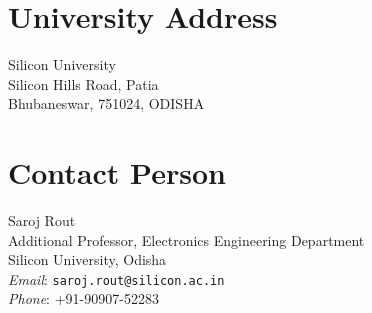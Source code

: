 \documentclass[12pt,twoside]{article}
\begin{document}
\section{University Address}
Silicon University \\
Silicon Hills Road, Patia \\
Bhubaneswar, 751024, ODISHA

\section{Contact Person}
Saroj Rout \\
Additional Professor, Electronics Engineering Department \\
Silicon University, Odisha \\
\textit{Email}: \texttt{saroj.rout@silicon.ac.in} \\
\textit{Phone}: +91-90907-52283 \\




\end{document}
